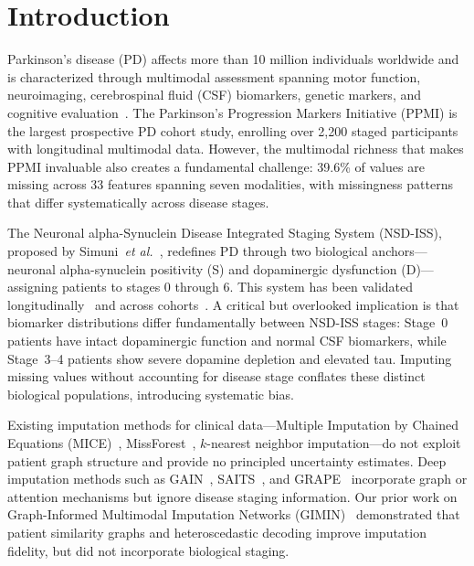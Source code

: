 \section{Introduction}
\label{p2:sec:introduction}

Parkinson's disease (PD) affects more than 10 million individuals worldwide and is characterized through multimodal assessment spanning motor function, neuroimaging, cerebrospinal fluid (CSF) biomarkers, genetic markers, and cognitive evaluation~\cite{postuma2015}. The Parkinson's Progression Markers Initiative (PPMI) is the largest prospective PD cohort study, enrolling over 2,200 staged participants with longitudinal multimodal data. However, the multimodal richness that makes PPMI invaluable also creates a fundamental challenge: 39.6\% of values are missing across 33 features spanning seven modalities, with missingness patterns that differ systematically across disease stages.

The Neuronal alpha-Synuclein Disease Integrated Staging System (NSD-ISS), proposed by Simuni~\textit{et al.}~\cite{simuni2024}, redefines PD through two biological anchors---neuronal alpha-synuclein positivity (S) and dopaminergic dysfunction (D)---assigning patients to stages 0 through 6. This system has been validated longitudinally~\cite{simuni2025} and across cohorts~\cite{russo2025}. A critical but overlooked implication is that biomarker distributions differ fundamentally between NSD-ISS stages: Stage~0 patients have intact dopaminergic function and normal CSF biomarkers, while Stage~3--4 patients show severe dopamine depletion and elevated tau. Imputing missing values without accounting for disease stage conflates these distinct biological populations, introducing systematic bias.

Existing imputation methods for clinical data---Multiple Imputation by Chained Equations (MICE)~\cite{buuren2011}, MissForest~\cite{stekhoven2012}, $k$-nearest neighbor imputation---do not exploit patient graph structure and provide no principled uncertainty estimates. Deep imputation methods such as GAIN~\cite{yoon2018}, SAITS~\cite{du2023}, and GRAPE~\cite{you2020} incorporate graph or attention mechanisms but ignore disease staging information. Our prior work on Graph-Informed Multimodal Imputation Networks (GIMIN)~\cite{dupre2025gimin} demonstrated that patient similarity graphs and heteroscedastic decoding improve imputation fidelity, but did not incorporate biological staging.

